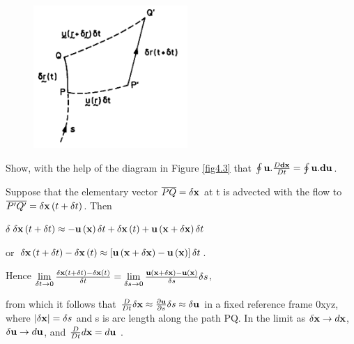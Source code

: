 \documentclass[10pt]{report}
\begin{document}
\begin{examplebox}

 \begin{figure}
 	\centerline{\includegraphics[width=2.3in]{Section44.pdf}}
 	\caption{ }
	\label{fig4.4}
 \end{figure}

Show, with the help of the diagram in Figure \ref{fig4.3} that $\oint {{\rm
{\bf u}}. \frac{D{{\bf dx}}}{Dt}} =\oint {{{\bf u}}.
{{\bf du}}} $.

\begin{examplesolution4}
	Suppose that the elementary vector $\overline {PQ} =\delta {{\bf x}}$ at
	t is advected with the flow to$\overline {{P}'{Q}'} =\delta {{\bf
	x}}\left( {t+\delta t} \right)$. Then

	\textbf{$\delta $}$\delta {{\bf x}}\left( {t+\delta t} \right)\approx
	-{{\bf u}}\left( {{\bf x}} \right)\delta t+\delta {{\bf
	x}}\left( t \right)+{{\bf u}}\left( {{{\bf x}}+\delta {{\bf x}}}
	\right)\delta t$

	or $\delta {{\bf x}}\left( {t+\delta t} \right)-\delta {{\bf
	x}}\left( t \right)\approx \left[ {{{\bf u}}\left( {{{\bf x}}+\delta
	{{\bf x}}} \right)-{{\bf u}}\left( {{\bf x}} \right)}
	\right]\delta t$.

	Hence $\mathop {\lim }\limits_{\delta t\to 0} \frac{\delta {{\bf
	x}}\left( {t+\delta t} \right)-\delta {{\bf x}}\left( t \right)}{\delta
	t}=\mathop {\lim }\limits_{\delta s\to 0} \frac{{{\bf u}}\left( {{\rm
	{\bf x}}+\delta {{\bf x}}} \right)-{{\bf u}}\left( {{\bf x}}
	\right)}{\delta s}\delta s$,

	from which it follows that $\frac{D}{Dt}\delta {{\bf x}}\approx
	\frac{\partial {{\bf u}}}{\partial s}\delta s\approx \delta {{\bf
	u}}$ in a fixed reference frame 0xyz, where $\left| {\delta {{\bf x}}}
	\right|=\delta s$ and s is arc length along the path PQ. In the limit as
	$\delta {{\bf x}}\to d{{\bf x}}$, $\delta {{\bf u}}\to d{\rm
	{\bf u}}$, and $\frac{D}{Dt}d{{\bf x}}=d{{\bf u}}$ .
\end{examplesolution4}

\end{examplebox}
\end{document}
